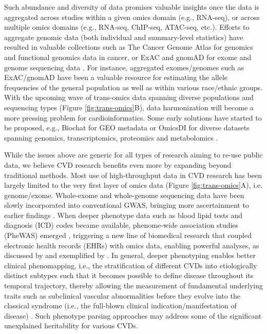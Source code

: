 \documentclass[letter]{bib}
\begin{document}
	

	
	Such abundance and diversity of data promises valuable insights once the data is aggregated across studies within a given omics domain (e.g., RNA-seq), or across multiple omics domains (e.g., RNA-seq, ChIP-seq, ATAC-seq, etc.). Efforts to aggregate genomic data (both individual and summary-level statistics) have resulted in valuable collections such as The Cancer Genome Atlas \citep{TCGA:2013:Cancer} for genomics and functional genomics data in cancer, or ExAC and gnomAD for exome and genome sequencing data \citep{Lek:2016:Analysis}. For instance, aggregated exomes/genomes such as ExAC/gnomAD have been a valuable resource for estimating the allele frequencies of the general population as well as within various race/ethnic groups. With the upcoming wave of trans-omics data spanning diverse populations and sequencing types (Figure \ref{fig:trans-omics}B), data harmonization will become a more pressing problem for cardioinformatics. Some early solutions have started to be proposed, e.g., Biochat for GEO metadata \citep{Khomtchouk:2018:Biochat} or OmicsDI for diverse datasets spanning genomics, transcriptomics, proteomics and metabolomics \citep{Perez-Riverol:2017:Discovering}.
	

	While the issues above are generic for all types of research aiming to re-use public data, we believe CVD research benefits even more by expanding beyond traditional methods. Most use of high-throughput data in CVD research has been largely limited to the very first layer of omics data (Figure \ref{fig:trans-omics}A), i.e. genome/exome. Whole-exome and whole-genome sequencing data have been slowly incorporated into conventional GWAS, bringing more ascertainment to earlier findings \citep{Cohen:2006:Sequence,Dewey:2016:Inactivating,CARDIoGRAM:2016:Coding,NHLBI:2014:LossofFunction}. When deeper phenotype data such as blood lipid tests and diagnosis (ICD) codes became available, phenome-wide association studies (PheWAS) emerged \citep{Denny:2013:Systematic}, triggering a new line of biomedical research that coupled electronic health records (EHRs) with omics data, enabling powerful analyses, as discussed by  \cite{Denaxas:2015:Big, Wu:2017:Omic} and exemplified by \cite{Dewey:2016:Distribution,Li:2018:Decoding}.  In general, deeper phenotyping enables better clinical phenomapping, i.e., the stratification of different CVDs into etiologically distinct subtypes such that it becomes possible to define disease throughout its temporal trajectory, thereby allowing the measurement of fundamental underlying traits such as subclinical vascular abnormalities before they evolve into the classical syndrome (i.e., the full-blown clinical indication/manifestation of disease) \citep{Cranley:2018:New}.  Such phenotype parsing approaches may address some of the significant unexplained heritability for various CVDs.    
\end{document}
